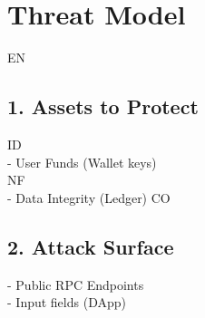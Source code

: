 \section*{Threat Model}
\vspace{0.5em}
\vspace{0.5em}
\vspace{0.5em}
\vspace{0.5em}
EN\\
\subsection*{1. Assets to Protect}
\vspace{0.5em}
\vspace{0.5em}
\vspace{0.5em}
\vspace{0.5em}
ID\\
- User Funds (Wallet keys)\\
\vspace{0.5em}
\vspace{0.5em}
\vspace{0.5em}
NF\\
- Data Integrity (Ledger)                 CO\\
\subsection*{2. Attack Surface}
- Public RPC Endpoints\\
- Input fields (DApp)\\
\vspace{0.5em}
\vspace{0.5em}
